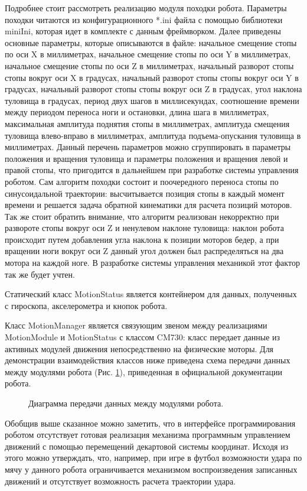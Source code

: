 Подробнее стоит рассмотреть реализацию модуля походки робота. Параметры походки читаются из конфигурационного *.ini файла с помощью библиотеки miniIni, которая идет в комплекте с данным фреймворком. Далее приведены основные параметры, которые описываются в файле: начальное смещение стопы по оси X в миллиметрах, начальное смещение стопы по оси Y в миллиметрах, начальное смещение стопы по оси Z в миллиметрах, начальный разворот стопы стопы вокруг оси X в градусах, начальный разворот стопы стопы вокруг оси Y в градусах, начальный разворот стопы стопы вокруг оси Z в градусах, угол наклона туловища в градусах, период двух шагов в миллисекундах, соотношение времени между периодом переноса ноги и остановки, длина шага в миллиметрах, максимальная амплитуда поднятия стопы в миллиметрах, амплитуда смещения туловища влево-вправо в миллиметрах, амплитуда подъема-опускания туловища в миллиметрах. Данный перечень параметров можно сгруппировать в параметры положения и вращения туловища и параметры положения и вращения левой и правой стопы, что пригодится в дальнейшем при разработке системы управления роботом. Сам алгоритм походки состоит и поочередного переноса стопы по синусоидальной траектории: высчитывается позиция стопы в каждый момент времени и решается задача обратной кинематики для расчета позиций моторов. Так же стоит обратить внимание, что алгоритм реализован некорректно при развороте стопы вокруг оси Z и ненулевом наклоне туловища: наклон робота происходит путем добавления угла наклона к позиции моторов бедер, а при вращении ноги вокруг оси Z данный угол должен был распределяться на два мотора на каждой ноге. В разработке системы управления механикой этот фактор так же будет учтен.

Статический класс MotionStatus является контейнером для данных, полученных с гироскопа, акселерометра и кнопок робота.

Класс MotionManager является связующим звеном между реализациями MotionModule и MotionStatus с классом CM730: класс передает данные из активных модулей движения непосредственно на физические моторы.
Для демонстрации взаимодействия классов ниже приведена схема передачи данных между модулями робота (Рис. \ref{im:1_framework_pipeline}), приведенная в официальной документации робота.

\begin{figure}[h]
\caption{Диаграмма передачи данных между модулями робота.}
\label{im:1_framework_pipeline}
\end{figure}

Обобщив выше сказанное можно заметить, что в интерфейсе программирования роботом отсутствует готовая реализация механизма программным управлением движений с помощью перемещений декартовой системы координат. Исходя из этого можно утверждать, что, например, при игре в футбол возможности удара по мячу у данного робота ограничивается механизмом воспроизведения записанных движений и отсутствует возможность расчета траектории удара. 
